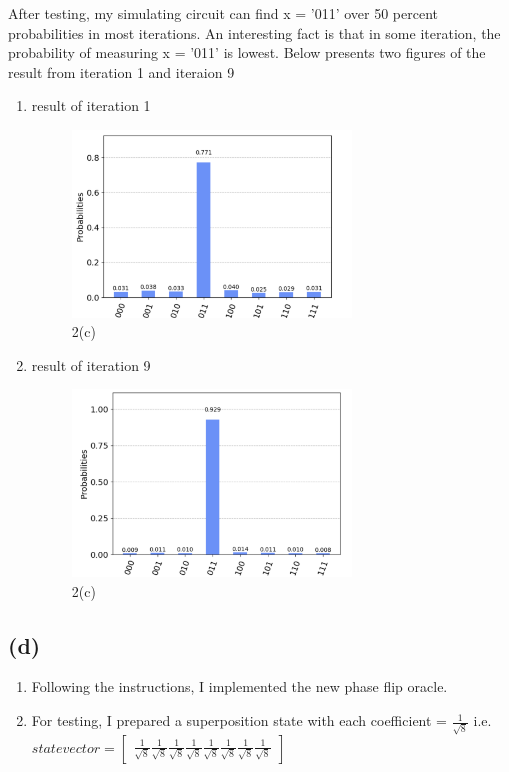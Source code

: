 \documentclass{article}
\begin{document}
\begin{CJK*}{UTF8}{bsmi}
After testing, my simulating circuit can find x = '011' over 50 percent probabilities in most iterations. An interesting fact is that in some iteration, the probability of measuring x = '011' is lowest.
Below presents two figures of the result from iteration 1 and iteraion 9
\begin{enumerate}
    \item result of iteration 1
    \begin{figure}[h]
    \centering
    \includegraphics[width=0.7\textwidth]{1.png}
    \caption{\label{fig:1.png}2(c)}
    \end{figure}
    \item result of iteration 9
    \begin{figure}[h]
    \centering
    \includegraphics[width=0.7\textwidth]{9.png}
    \caption{\label{fig:9.png}2(c)}
    \end{figure}
\end{enumerate}
\subsection{(d)}
\begin{enumerate}
    \item Following the instructions, I implemented the new phase flip oracle.  

    \item For testing, I prepared a superposition state with each coefficient = $\frac{1}{\sqrt{8}}$ i.e. $statevector = \begin{bmatrix}
    \frac{1}{\sqrt{8}} \frac{1}{\sqrt{8}} \frac{1}{\sqrt{8}} \frac{1}{\sqrt{8}} \frac{1}{\sqrt{8}} \frac{1}{\sqrt{8}} \frac{1}{\sqrt{8}} \frac{1}{\sqrt{8}}
    \end{bmatrix}$
    

\end{enumerate}
\end{CJK*}
\end{document}
